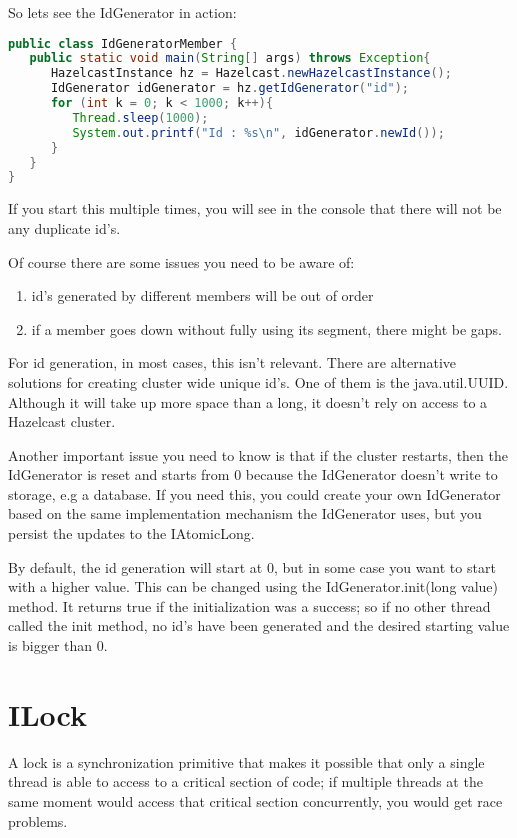 So lets see the IdGenerator in action:
\begin{lstlisting}[language=java]
public class IdGeneratorMember {
   public static void main(String[] args) throws Exception{
      HazelcastInstance hz = Hazelcast.newHazelcastInstance();
      IdGenerator idGenerator = hz.getIdGenerator("id");
      for (int k = 0; k < 1000; k++){
         Thread.sleep(1000);
         System.out.printf("Id : %s\n", idGenerator.newId());
      }
   }
}
\end{lstlisting}
If you start this multiple times, you will see in the console that there will not be any duplicate id's.

Of course there are some issues you need to be aware of:
\begin{enumerate}
\item id's generated by different members will be out of order
\item if a member goes down without fully using its segment, there might be gaps.
\end{enumerate}
For id generation, in most cases, this isn't relevant. There are alternative solutions for creating cluster wide unique id's. One of them is the java.util.UUID. Although it will take up more space than a long, it doesn't rely on access to a Hazelcast cluster.

Another important issue you need to know is that if the cluster restarts, then the IdGenerator is reset and starts from 0 because the IdGenerator doesn't write to storage, e.g a database. If you need this, you could create your own IdGenerator based on the same implementation mechanism the IdGenerator uses, but you persist the updates to the IAtomicLong.

By default, the id generation will start at 0, but in some case you want to start with a higher value. This can be changed using the IdGenerator.init(long value) method. It returns true if the initialization was a success; so if no other thread called the init method, no id's have been generated and the desired starting value is bigger than 0.

\section{ILock}
A lock is a synchronization primitive that makes it possible that only a single thread is able to access to a critical section of code; if multiple threads at the same moment would access that critical section concurrently, you would get race problems. 

